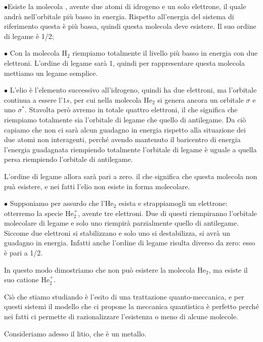 $\bullet$Esiste la molecola , avente due atomi di idrogeno e un solo elettrone, il quale andrà nell'orbitale più basso in energia. Rispetto all'energia del sistema di riferimento questa è più bassa, quindi questa molecola deve esistere. Il suo ordine di legame è 1/2;

\vspace{0.2cm}$\bullet$ Con la molecola H$_2$ riempiamo totalmente il livello più basso in energia con due elettroni. L'ordine di legame sarà 1, quindi per rappresentare questa molecola mettiamo un legame semplice.

\vspace{0.2cm}$\bullet$ L'elio è l'elemento successivo all'idrogeno, quindi ha due elettroni, ma l'orbitale continua a essere l'$1s$, per cui nella molecola He$_2$ si genera ancora un orbitale $\sigma$ e uno $\sigma^*$. Stavolta però avremo in totale quattro elettroni, il che significa che riempiamo totalmente sia l'orbitale di legame che quello di antilegame. Da ciò capiamo che non ci sarà alcun guadagno in energia rispetto alla situazione dei due atomi non interagenti, perché avendo mantenuto il baricentro di energia l'energia guadagnata riempiendo totalmente l'orbitale di legame è uguale a quella persa riempiendo l'orbitale di antilegame.

L'ordine di legame allora sarà pari a zero. il che significa che questa molecola non puà esistere, e nei fatti l'elio non esiste in forma molecolare.

\vspace{0.2cm}$\bullet$ Supponiamo per assurdo che l'He$_2$ esista e strappiamogli un elettrone: otterremo la specie He$_2^+$, avente tre elettroni. Due di questi riempiranno l'orbitale molecolare di legame e solo uno riempirà parzialmente quello di antilegame. Siccome due elettroni si stabilizzano e solo uno si destabilizza, si avrà un guadagno in energia. Infatti anche l'ordine di legame risulta diverso da zero: esso è pari a 1/2.

In questo modo dimostriamo che non può esistere la molecola He$_2$, ma esiste il suo catione He$_2^+$.

\vspace{0.2cm} Ciò che stiamo studiando è l'esito di una trattazione quanto-meccanica, e per questi sistemi il modello che ci propone la meccanica quantistica è perfetto perché nei fatti ci permette di razionalizzare l'esistenza o meno di alcune molecole.

\vspace{0.2cm}Consideriamo adesso il litio, che è un metallo.

